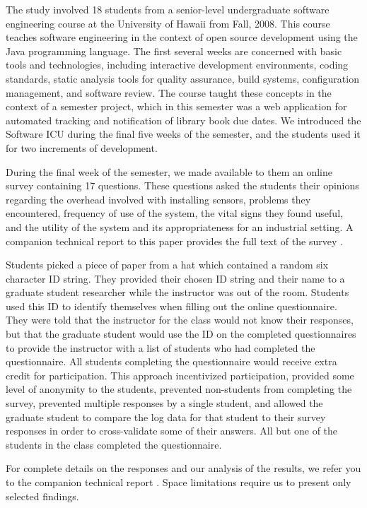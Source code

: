 \documentclass{acm_proc_article-sp}
\begin{document}
The study involved 18 students from a senior-level undergraduate software
engineering course at the University of Hawaii from Fall, 2008. This course
teaches software engineering in the context of open source development
using the Java programming language.  The first several weeks are concerned
with basic tools and technologies, including interactive development
environments, coding standards, static analysis tools for quality
assurance, build systems, configuration management, and software review.
The course taught these concepts in the context of a semester project,
which in this semester was a web application for automated tracking and
notification of library book due dates.  We introduced the Software ICU
during the final five weeks of the semester, and the students used it for
two increments of development.

During the final week of the semester, we made available to them an online
survey containing 17 questions.  These questions asked the students their
opinions regarding the overhead involved with installing sensors, problems
they encountered, frequency of use of the system, the vital signs they
found useful, and the utility of the system and its appropriateness for an
industrial setting.  A companion technical report to this paper provides
the full text of the survey \cite{csdl2-09-03}.

Students picked a piece of paper from a hat which contained a random six
character ID string.  They provided their chosen ID string and their name
to a graduate student researcher while the instructor was out of the room.
Students used this ID to identify themselves when filling out the online
questionnaire.  They were told that the instructor for the class would not
know their responses, but that the graduate student would use the ID on the
completed questionnaires to provide the instructor with a list of students
who had completed the questionnaire.  All students completing the
questionnaire would receive extra credit for participation.  This approach
incentivized participation, provided some level of anonymity to the
students, prevented non-students from completing the survey, prevented
multiple responses by a single student, and allowed the graduate student to
compare the log data for that student to their survey responses in order to
cross-validate some of their answers. All but one of the students in the
class completed the questionnaire.

For complete details on the responses and our analysis of the results, we 
refer you to the companion technical report \cite{csdl2-09-03}.  Space limitations 
require us to present only selected findings. 
\end{document}
